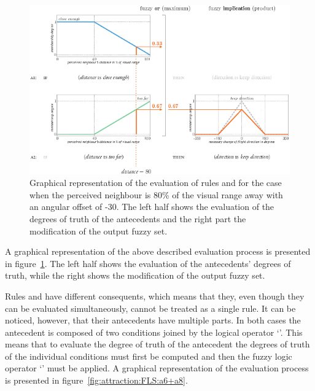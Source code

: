 \begin{figure}%
\includegraphics{fig[attractionFLSa1+a2]}
\caption{Graphical representation of the evaluation of rules  and  for the case when the perceived neighbour is 80\% of the visual range away with an angular offset of -30\deg. The left half shows the evaluation of the degrees of truth of the antecedents and the right part the modification of the output fuzzy set.}
\label{fig:attraction:FLS:a1+a2}
\end{figure}

A graphical representation of the above described evaluation process is presented in figure~\ref{fig:attraction:FLS:a1+a2}. The left half shows the evaluation of the antecedents' degrees of truth, while the right shows the modification of the output fuzzy set.

Rules  and  have different consequents, which means that they, even though they can be evaluated simultaneously, cannot be treated as a single rule. It can be noticed, however, that their antecedents have multiple parts. In both cases the antecedent is composed of two conditions joined by the logical operator `'. This means that to evaluate the degree of truth of the antecedent the degrees of truth of the individual conditions must first be computed and then the fuzzy logic operator `' must be applied. A graphical representation of the evaluation process is presented in figure~\ref{fig:attraction:FLS:a6+a8}.

